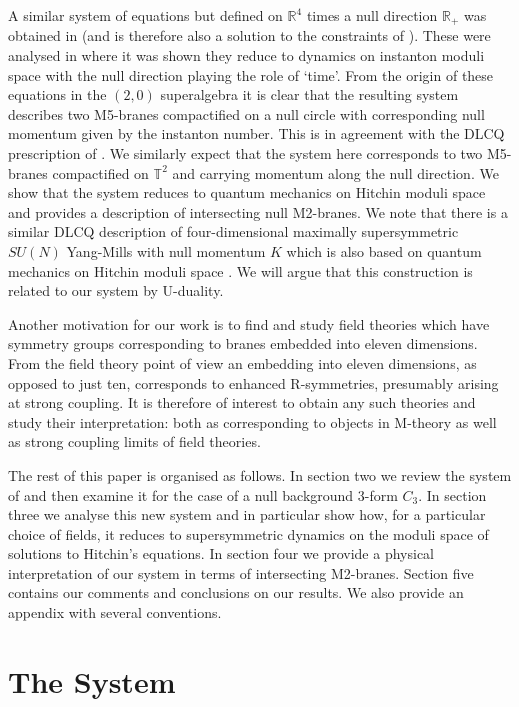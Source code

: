 \documentclass[12pt]{article}
\numberwithin{equation}{section}
\begin{document}
A similar system of equations but defined on ${\mathbb R}^4$ times a null direction ${\mathbb R}_+$ was obtained in \cite{Lambert:2010wm} (and is therefore also a solution to the constraints of \cite{Lambert:2016xbs}). These were analysed in \cite{Lambert:2011gb} where it was shown they reduce to dynamics on instanton moduli space with the null direction playing the role of `time'. From the origin of these equations in the $(2,0)$ superalgebra it is clear that the resulting system describes two M5-branes compactified on a null circle with corresponding null momentum given by the instanton number. This is in agreement with the DLCQ prescription of \cite{Aharony:1997th,Aharony:1997an}. We similarly expect that the system here corresponds to two M5-branes compactified on ${\mathbb T}^2$ and carrying momentum along the null direction. We show that  the system reduces to quantum mechanics on Hitchin moduli space and provides a   description of intersecting null M2-branes. We note that there is a similar DLCQ description of four-dimensional maximally supersymmetric $SU(N)$ Yang-Mills with null momentum $K$  which is also based on quantum mechanics on Hitchin moduli space \cite{Ganor:1997jx,Kapustin:1998pb}. We will argue that this construction is related to our system by U-duality.

Another motivation for our work is to find and study field theories which have symmetry groups corresponding to branes embedded into eleven dimensions. From the field theory point of view   an embedding into eleven dimensions, as opposed to just ten, corresponds to enhanced R-symmetries, presumably arising at strong coupling. It is therefore of interest to obtain any such theories and study their interpretation: both as corresponding to objects in M-theory as well as strong coupling limits of field theories.

The rest of this paper is organised as follows. In section two we review the system of \cite{Lambert:2016xbs} and then examine it for the case of a null background 3-form $C_3$. In section three we analyse this new system and in particular show how, for a particular choice of fields,  it reduces to supersymmetric dynamics on the moduli space of solutions to Hitchin's equations. In section four we provide a physical interpretation of our system in terms of intersecting M2-branes. Section five contains our comments and conclusions on our results. We also provide an appendix with several conventions.

\section{The System}
\end{document}
